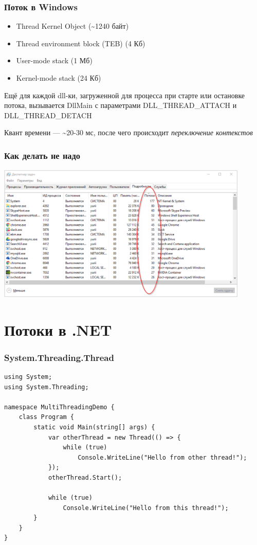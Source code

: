 \documentclass[xetex,mathserif,serif]{beamer}
\begin{document}
	\begin{frame}
		\frametitle{Поток в Windows}
		\begin{itemize}
			\item Thread Kernel Object (\textasciitilde1240 байт)
			\item Thread environment block (TEB) (4 Кб)
			\item User-mode stack (1 Мб)
			\item Kernel-mode stack (24 Кб)
		\end{itemize}

		Ещё для каждой dll-ки, загруженной для процесса при старте или остановке потока, вызывается DllMain с параметрами DLL\_THREAD\_ATTACH и DLL\_THREAD\_DETACH

		\vspace{3mm}
		Квант времени --- \textasciitilde20-30 мс, после чего происходит \textit{переключение контекстов}
	\end{frame}

	\begin{frame}
		\frametitle{Как делать не надо}
		\begin{center}
			\includegraphics[width=0.9\textwidth]{threadsEverywhere.png}
		\end{center}
	\end{frame}

	\section{Потоки в .NET}

	\begin{frame}[fragile]
		\frametitle{System.Threading.Thread}
		\begin{footnotesize}
			\begin{verbatim}
using System;
using System.Threading;

namespace MultiThreadingDemo {
    class Program {
        static void Main(string[] args) {
            var otherThread = new Thread(() => {
                while (true)
                    Console.WriteLine("Hello from other thread!");
            });
            otherThread.Start();

            while (true)
                Console.WriteLine("Hello from this thread!");
        }
    }
}
			\end{verbatim}
		\end{footnotesize}
	\end{frame}
\end{document}
